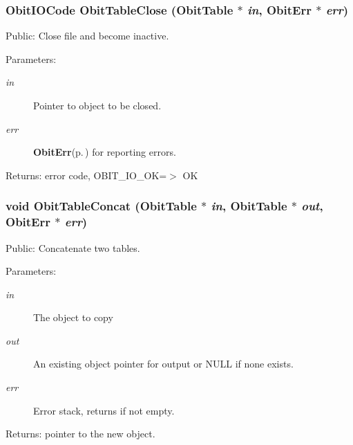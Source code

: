 \subsubsection{\setlength{\rightskip}{0pt plus 5cm}Obit\-IOCode Obit\-Table\-Close ({\bf Obit\-Table} $\ast$ {\em in}, {\bf Obit\-Err} $\ast$ {\em err})}\label{ObitTable_8h_a40}


Public: Close file and become inactive. 

\begin{Desc}
\item[Parameters:]
\begin{description}
\item[{\em in}]Pointer to object to be closed. \item[{\em err}]{\bf Obit\-Err}{\rm (p.\,\pageref{structObitErr})} for reporting errors. \end{description}
\end{Desc}
\begin{Desc}
\item[Returns:]error code, OBIT\_\-IO\_\-OK=$>$ OK \end{Desc}
\subsubsection{\setlength{\rightskip}{0pt plus 5cm}void Obit\-Table\-Concat ({\bf Obit\-Table} $\ast$ {\em in}, {\bf Obit\-Table} $\ast$ {\em out}, {\bf Obit\-Err} $\ast$ {\em err})}\label{ObitTable_8h_a37}


Public: Concatenate two tables. 

\begin{Desc}
\item[Parameters:]
\begin{description}
\item[{\em in}]The object to copy \item[{\em out}]An existing object pointer for output or NULL if none exists. \item[{\em err}]Error stack, returns if not empty. \end{description}
\end{Desc}
\begin{Desc}
\item[Returns:]pointer to the new object. \end{Desc}
